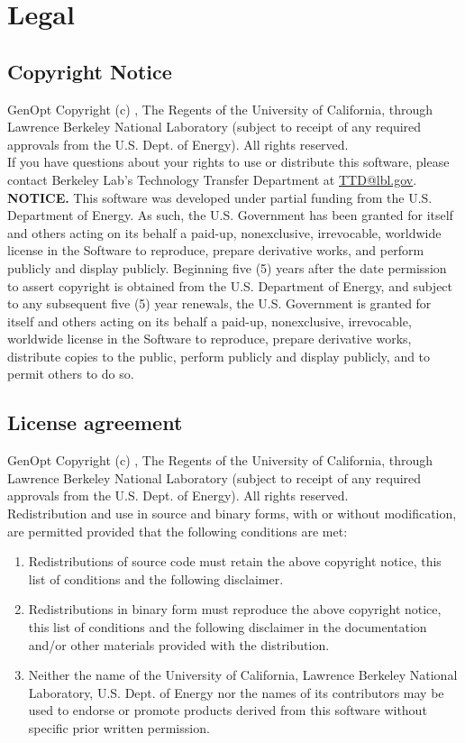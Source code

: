 \chapter{Legal}
\section{Copyright Notice}
GenOpt Copyright (c) \copyrightyears, The Regents of the University of California, through Lawrence Berkeley National Laboratory (subject to receipt of any required approvals from the U.S. Dept. of Energy).  All rights reserved.\\

If you have questions about your rights to use or distribute this software, please contact Berkeley Lab's Technology Transfer Department at \url{TTD@lbl.gov}.\\

{\bf NOTICE.} This software was developed under partial funding from the U.S. Department of Energy.  As such, the U.S. Government has been granted for itself and others acting on its behalf a paid-up, nonexclusive, irrevocable, worldwide license in the Software to reproduce, prepare derivative works, and perform publicly and display publicly.  Beginning five (5) years after the date permission to assert copyright is obtained from the U.S. Department of Energy, and subject to any subsequent five (5) year renewals, the U.S. Government is granted for itself and others acting on its behalf a paid-up, nonexclusive, irrevocable, worldwide license in the Software to reproduce, prepare derivative works, distribute copies to the public, perform publicly and display publicly, and to permit others to do so.

\section{License agreement}
GenOpt Copyright (c) \copyrightyears, The Regents of the University of California, through Lawrence Berkeley National Laboratory (subject to receipt of any required approvals from the U.S. Dept. of Energy).  All rights reserved.\\

Redistribution and use in source and binary forms, with or without modification, are permitted provided that the following conditions are met:
\begin{enumerate}
\item
Redistributions of source code must retain the above copyright notice, this list of conditions and the following disclaimer.
\item
Redistributions in binary form must reproduce the above copyright notice, this list of conditions and the following disclaimer in the documentation and/or other materials provided with the distribution.
\item
Neither the name of the University of California, Lawrence Berkeley National Laboratory, U.S. Dept. of Energy nor the names of its contributors may be used to endorse or promote products derived from this software without specific prior written permission.
\end{enumerate}

